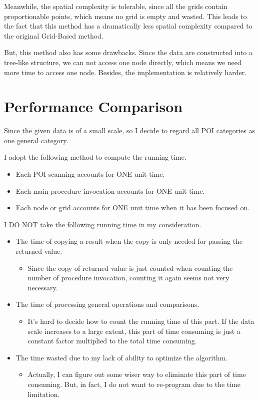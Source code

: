 \documentclass{acm_proc_article-sp}
\begin{document}
Meanwhile, the spatial complexity is tolerable, since all the grids contain proportionable points, which means no grid is empty and wasted. This leads to the fact that this method has a dramatically less spatial complexity compared to the original Grid-Based method.

But, this method also has some drawbacks. Since the data are constructed into a tree-like structure, we can not access one node directly, which means we need more time to access one node. Besides, the implementation is relatively harder. 

\section{Performance Comparison}

Since the given data is of a small scale, so I decide to regard all POI categories as one general category. 

I adopt the following method to compute the running time.
\begin{itemize}
\item Each POI scanning accounts for ONE unit time.
\item Each main procedure invocation accounts for ONE unit time.
\item Each node or grid accounts for ONE unit time when it has been focused on.
\end{itemize}

I DO NOT take the following running time in my consideration.
\begin{itemize}
\item The time of copying a result when the copy is only needed for passing the returned value.
\begin{itemize}
\item Since the copy of returned value is just counted when counting the number of procedure invocation, counting it again seems not very necessary.
\end{itemize}
\item The time of processing general operations and comparisons.
\begin{itemize}
\item It's hard to decide how to count the running time of this part. If the data scale increases to a large extent, this part of time consuming is just a constant factor multiplied to the total time consuming.
\end{itemize}
\item The time wasted due to my lack of ability to optimize the algorithm.
\begin{itemize}
\item Actually, I can figure out some wiser way to eliminate this part of time consuming. But, in fact, I do not want to re-program due to the time limitation.
\end{itemize}
\end{itemize}
\end{document}
